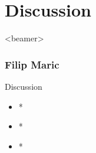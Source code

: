 \section{Discussion}
\begin{frame}<beamer>
\frametitle{Filip Maric}
\tableofcontents[currentsection]
\end{frame}


\begin{frame}{Discussion}{}


  \begin{itemize}
    \item<1-> *
    \item<2-> *
    \item<3-> *
  \end{itemize}


\end{frame}




